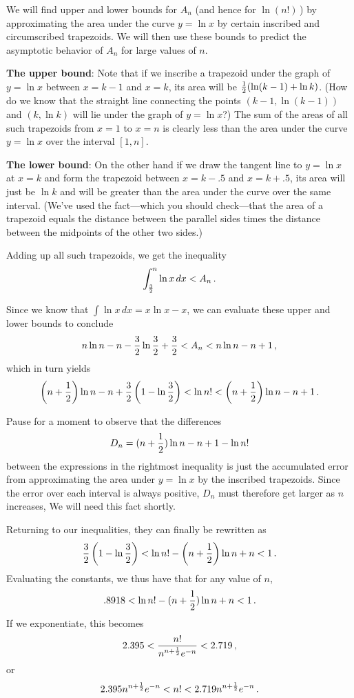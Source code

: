 {{{{We will find upper and lower bounds for $A_n$ (and hence for $\ln(n!)$\,) by approximating the area under the curve $y=\ln x$ by certain inscribed and circumscribed trapezoids.  We will then use these bounds to predict the asymptotic behavior of $A_n$ for large values of $n$.

\medskip



{\bf The upper bound}:  Note that if we inscribe a trapezoid under the graph of $y=\ln x$ between $x=k-1$ and $x=k$, its area will be ${1 \over 2}(\ln (k-1) +\ln k)$. (How do we know that the straight line connecting the points $(k-1, \ln (k-1))$ and $(k, \ln k)$ will lie under the graph of $y=\ln x$?) The sum of the areas of all such trapezoids from $x=1$ to $x=n$ is clearly less than the area under the curve $y=\ln x$ over the interval $[1,n]$. \ \


{\bf The lower bound}: On the other hand if we draw the tangent line to $y=\ln x$ at \mbox{$x=k$} and form the trapezoid between $x=k-.5$ and $x=k+.5$, its area will just be $\ln k$ and will be greater than the area under the curve over the same interval. (We've used the fact---which you should check---that the area of a trapezoid equals the distance between the parallel sides times the distance between the midpoints of the other two sides.) \ \

\vspace{3pt}
Adding up all such trapezoids, we get the inequality
\[
\int_{{3 \over 2}}^n\ln x\,dx <A_n\,.
\]

Since we know that $\int \ln x\,dx = x\ln x -x$, we can evaluate these upper and lower bounds to conclude
\[
n\ln n-n-{3 \over 2}\ln {3 \over 2} + {3 \over 2} <A_n<n\ln n -n +1\,,
\]
which in turn yields
\[
\left(n+{1 \over 2}\right)\ln n-n+{3 \over 2}\left(1-\ln {3 \over 2}\right) <\ln n!<\left(n+{1 \over 2}\right)\ln n -n +1\,.
\]

Pause for a moment to observe that the differences 
\[
D_n = (n+{1 \over 2})\ln n -n +1-\ln n!
\] 
between the expressions  in the rightmost inequality is just the accumulated error from approximating the area under $y=\ln x$ by the inscribed trapezoids. Since the error over each interval is always positive, $D_n$ must therefore get larger as $n$ increases,   We will need this fact shortly.

Returning to our inequalities, they can finally be rewritten as
\[
{3 \over 2}\left(1-\ln {3 \over 2}\right) <\ln n!-\left(n+{1 \over 2}\right)\ln n +n <1\,.
\]
Evaluating the constants, we thus have that for any value of $n$,
\[
.8918<\ln n!-(n+{1 \over 2})\ln n +n <1\,.
\]
If we exponentiate, this becomes
\[
2.395<{n! \over n^{n+{1 \over 2}}e^{-n}} <2.719\,,
\]
or
\[
2.395n^{n+{1 \over 2}}e^{-n} <n!<2.719n^{n+{1 \over 2}}e^{-n}\,.
\]

}}}}
